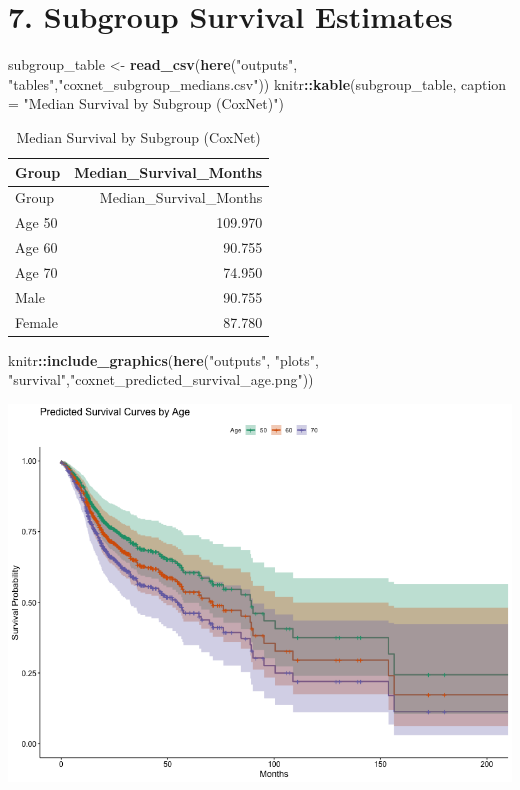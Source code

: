 \documentclass[
  11pt,
]{article}
\newenvironment{Shaded}{\begin{snugshade}}{\end{snugshade}}
\newcommand{\AttributeTok}[1]{\textcolor[rgb]{0.13,0.29,0.53}{#1}}
\newcommand{\FunctionTok}[1]{\textcolor[rgb]{0.13,0.29,0.53}{\textbf{#1}}}
\newcommand{\NormalTok}[1]{#1}
\newcommand{\OtherTok}[1]{\textcolor[rgb]{0.56,0.35,0.01}{#1}}
\newcommand{\SpecialCharTok}[1]{\textcolor[rgb]{0.81,0.36,0.00}{\textbf{#1}}}
\newcommand{\StringTok}[1]{\textcolor[rgb]{0.31,0.60,0.02}{#1}}
\begin{document}
\section{7. Subgroup Survival
Estimates}\label{subgroup-survival-estimates}

\begin{Shaded}
\begin{Highlighting}[]
\NormalTok{subgroup\_table }\OtherTok{\textless{}{-}} \FunctionTok{read\_csv}\NormalTok{(}\FunctionTok{here}\NormalTok{(}\StringTok{"outputs"}\NormalTok{, }\StringTok{"tables"}\NormalTok{,}\StringTok{"coxnet\_subgroup\_medians.csv"}\NormalTok{))}
\NormalTok{knitr}\SpecialCharTok{::}\FunctionTok{kable}\NormalTok{(subgroup\_table, }\AttributeTok{caption =} \StringTok{"Median Survival by Subgroup (CoxNet)"}\NormalTok{)}
\end{Highlighting}
\end{Shaded}

\begin{longtable}[]{@{}lr@{}}
\caption{Median Survival by Subgroup (CoxNet)}\tabularnewline
\toprule\noalign{}
Group & Median\_Survival\_Months \\
\midrule\noalign{}
\endfirsthead
\toprule\noalign{}
Group & Median\_Survival\_Months \\
\midrule\noalign{}
\endhead
\bottomrule\noalign{}
\endlastfoot
Age 50 & 109.970 \\
Age 60 & 90.755 \\
Age 70 & 74.950 \\
Male & 90.755 \\
Female & 87.780 \\
\end{longtable}

\begin{Shaded}
\begin{Highlighting}[]
\NormalTok{knitr}\SpecialCharTok{::}\FunctionTok{include\_graphics}\NormalTok{(}\FunctionTok{here}\NormalTok{(}\StringTok{"outputs"}\NormalTok{, }\StringTok{"plots"}\NormalTok{, }\StringTok{"survival"}\NormalTok{,}\StringTok{"coxnet\_predicted\_survival\_age.png"}\NormalTok{))}
\end{Highlighting}
\end{Shaded}

\includegraphics[width=0.8\linewidth]{../outputs/plots/survival/coxnet_predicted_survival_age}
\end{document}
